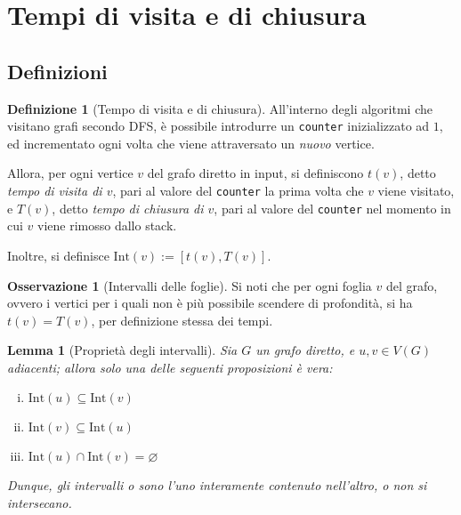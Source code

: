 \documentclass[14pt]{extreport}
\newtheorem{lemma}{Lemma}[subsection]
\theoremstyle{definition}
\newtheorem{definition}{Definizione}[subsection]
\theoremstyle{definition}
\newtheorem{remark}{Osservazione}[subsection]
\begin{document}
\section{Tempi di visita e di chiusura}

\subsection{Definizioni}

\begin{definition}[Tempo di visita e di chiusura]
    All'interno degli algoritmi che visitano grafi secondo DFS, è possibile introdurre un \texttt{counter} inizializzato ad $1$, ed incrementato ogni volta che viene attraversato un \textit{nuovo} vertice.

    Allora, per ogni vertice $v$ del grafo diretto in input, si definiscono $t(v)$, detto \textit{tempo di visita di $v$}, pari al valore del \texttt{counter} la prima volta che $v$ viene visitato, e $T(v)$, detto \textit{tempo di chiusura di $v$}, pari al valore del \texttt{counter} nel momento in cui $v$ viene rimosso dallo stack.

    Inoltre, si definisce $\mathrm{Int}(v) := [t(v), T(v)]$.
\end{definition}

\begin{remark}[Intervalli delle foglie]
    Si noti che per ogni foglia $v$ del grafo, ovvero i vertici per i quali non è più possibile scendere di profondità, si ha $t(v) = T(v)$, per definizione stessa dei tempi.
\end{remark}

\begin{lemma}[Proprietà degli intervalli]
    \label{Intervalli diretto}
    Sia $G$ un grafo diretto, e $u, v \in V(G)$ adiacenti; allora solo una delle seguenti proposizioni è vera:
    \begin{enumerate}[i)]
        \item $\mathrm{Int}(u) \subseteq \mathrm{Int}(v)$
        \item $\mathrm{Int}(v) \subseteq \mathrm{Int}(u)$
        \item $\mathrm{Int}(u) \cap \mathrm{Int}(v) = \varnothing$
    \end{enumerate}
    
    Dunque, gli intervalli o sono l'uno interamente contenuto nell'altro, o non si intersecano.
\end{lemma}
\end{document}
